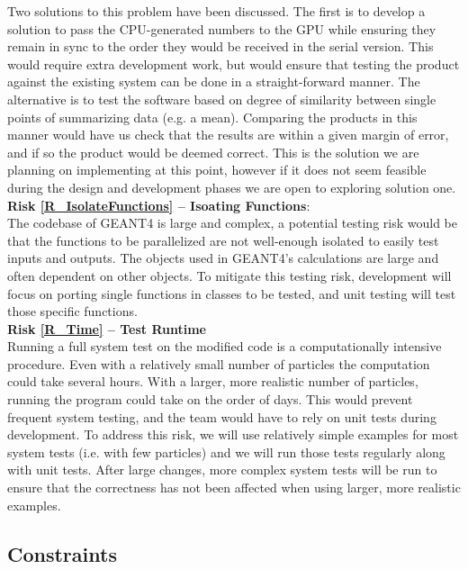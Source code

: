 \documentclass[12pt]{article}
\begin{document}
Two solutions to this problem have been discussed. The first is to develop a solution to pass the CPU-generated numbers to the GPU while ensuring they remain in sync to the order they would be received in the serial version. This would require extra development work, but would ensure that testing the product against the existing system can be done in a straight-forward manner. The alternative is to test the software based on degree of similarity between single points of summarizing data (e.g. a mean). Comparing the products in this manner would have us check that the results are within a given margin of error, and if so the product would be deemed correct. This is the solution we are planning on implementing at this point, however if it does not seem feasible during the design and development phases we are open to exploring solution one.\\

\textbf{Risk \ref{R_IsolateFunctions} -- Isoating Functions}:\\
The codebase of GEANT4 is large and complex, a potential testing risk would be that the functions to be parallelized are not well-enough isolated to easily test inputs and outputs. The objects used in GEANT4's calculations are large and often dependent on other objects. To mitigate this testing risk, development will focus on porting single functions in classes to be tested, and unit testing will test those specific functions.\\

\textbf{Risk \ref{R_Time} -- Test Runtime}\\
Running a full system test on the modified code is a computationally intensive procedure. Even with a relatively small number of particles the computation could take several hours. With a larger, more realistic number of particles, running the program could take on the order of days. This would prevent frequent system testing, and the team would have to rely on unit tests during development. To address this risk, we will use relatively simple examples for most system tests (i.e. with few particles) and we will run those tests regularly along with unit tests. After large changes, more complex system tests will be run to ensure that the correctness has not been affected when using larger, more realistic examples.

\subsection{Constraints} %
\end{document}

